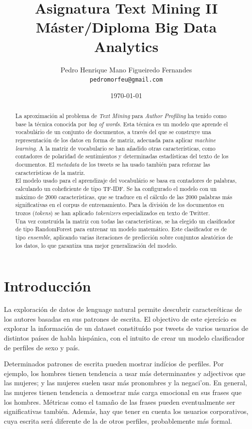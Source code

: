 \documentclass[11pt,a4paper]{article}
\title{Asignatura Text Mining II\\
M\'aster/Diploma Big Data Analytics}
\author{Pedro Henrique Mano Figueiredo Fernandes \\
  {\tt pedromorfeu@gmail.com} \\}
\date{\today}
\begin{document}
\maketitle
\begin{abstract}

  La aproximaci\'on al problema de {\em Text Mining} para {\em Author Profiling} ha tenido como base la t\'ecnica conocida por {\em bag of words}. Esta t\'ecnica es un modelo que aprende el vocabul\'ario de un conjunto de documentos, a trav\'es del que se construye una representaci\'on de los datos en forma de matriz, adecuada para aplicar {\em machine learning}. A la matriz de vocabulario se han a\~nadido otras caracter\'isticas, como contadores de polaridad de sentimientos y determinadas estad\'isticas del texto de los documentos. El {\em metadata} de los tweets se ha usado tambi\'en para reforzar las caracter\'isticas de la matriz.\\
  El modelo usado para el aprendizaje del vocabul\'ario se basa en contadores de palabras, calculando un coheficiente de tipo TF-IDF. Se ha configurado el modelo con un m\'aximo de 2000 caracter\'isticas, que se traduce en el c\'alculo de las 2000 palabras más significativas en el corpus de entrenamiento. Para la divisi\'on de los documentos en trozos ({\em tokens}) se han aplicado {\em tokenizers} especializados en texto de Twitter.\\
  Una vez constru\'ida la matriz con todas las caracter\'isticas, se ha elegido un clasificador de tipo RandomForest para entrenar un modelo matem\'atico. Este clasificador es de tipo {\em ensemble}, aplicando varias iteraciones de predicci\'on sobre conjuntos aleat\'orios de los datos, lo que garantiza una mejor generalizaci\'on del modelo.

\end{abstract}


\section{Introducci\'on}

  La exploraci\'on de datos de lenguage natural permite descubrir caracter\'sticas de los autores basadas en sus patrones de escrita. El objectivo de este ejerc\'icio es explorar la informaci\'on de un dataset constitu\'ido por tweets de varios usuarios de distintos pa\'ises de habla hisp\'anica, con el intuito de crear un modelo clasificador de perfiles de sexo y pa\'is.

  Determinados patrones de escrita pueden mostrar ind\'icios de perfiles. Por ejemplo, los hombres tienen tendencia a usar m\'as determinantes y adjectivos que las mujeres; y las mujeres suelen usar m\'as pronombres y la negaci'on. En general, las mujeres tienen tendencia a demostrar m\'as carga emocional en sus frases que los hombres. M\'etricas como el tamaño de las frases pueden eventualmente ser significativas tambi\'en. Adem\'as, hay que tener en cuenta los usuarios corporativos, cuya escrita ser\'a diferente de la de otros perfiles, probablemente m\'as formal.
\end{document}
